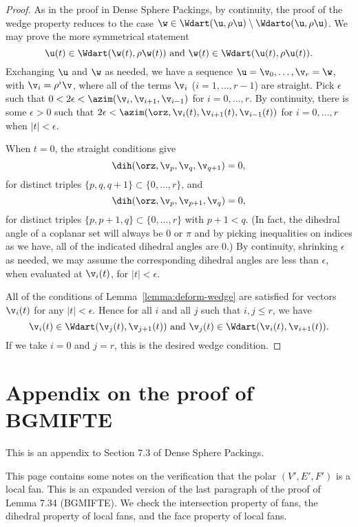 \begin{proof}
As in the proof in Dense Sphere Packings,  by continuity,
the proof of the wedge property reduces to the case $\w\in \Wdart(\u,\rho\u)\setminus \Wdarto(\u,\rho\u)$.
We may prove the more symmetrical statement
\[
\u(t)\in \Wdart(\w(t),\rho\w(t)) \text{ and } \w(t) \in \Wdart(\u(t),\rho\u(t)).
\]
Exchanging $\u$ and $\w$ as needed, 
we have a sequence $\u=\v_0,\ldots,\v_r =\w$, with $\v_i =\rho^i\v$,
where all of the terms $\v_i$ ($i=1,\ldots,r-1$) are straight.
Pick $\epsilon$ such that  $0 < 2\epsilon < \azim(\v_i,\v_{i+1},\v_{i-1})$ for $i=0,\ldots,r$.
By continuity, there is some $\epsilon > 0$ such that
$2\epsilon < \azim(\orz,\v_i(t),\v_{i+1}(t),\v_{i-1}(t))$ for $i=0,\ldots,r$ when $|t|<\epsilon$.

When $t=0$, the straight conditions give
\[
\dih(\orz,\v_p,\v_q,\v_{q+1}) = 0,
\]
for distinct triples $\{p,q,q+1\} \subset \{0,\ldots,r\}$,
and
\[
\dih(\orz,\v_p,\v_{p+1},\v_q)=0,
\]
for distinct triples $\{p,p+1,q\}\subset \{0,\ldots,r\}$ with $p+1 < q$.
(In fact, the dihedral angle of a coplanar set will always be $0$ or $\pi$ and by picking
inequalities on indices as we have, all of the indicated dihedral angles are $0$.)
By continuity, shrinking $\epsilon$ as needed, we may assume the corresponding
dihedral angles are less than $\epsilon$, when evaluated at $\v_i(t)$, for $|t|<\epsilon$.

All of the conditions of Lemma~\ref{lemma:deform-wedge} are satisfied for
vectors $\v_i(t)$ for any $|t|<\epsilon$.  Hence for all $i$ and all $j$ such that $i,j\le r$, we have
\[
\v_i(t) \in \Wdart(\v_{j}(t),\v_{j+1}(t)) \text{ and } \v_j(t) \in \Wdart(\v_{i}(t),\v_{i+1}(t)).
\]
If we take $i=0$ and $j=r$, this is the desired wedge condition.
\end{proof}





\newpage
\section{Appendix on the proof of BGMIFTE}

This is an appendix to Section 7.3 of Dense Sphere Packings.

This page contains some notes on the verification that the polar $(V',E',F')$ is
a local fan.   This is an expanded version of  the last paragraph
of the proof of Lemma 7.34 (BGMIFTE).
We check the intersection property of fans, the dihedral property
of local fans, and the face property of local fans.


